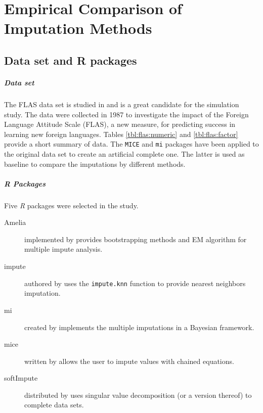 \chapter{Empirical Comparison of Imputation Methods}



\section{Data set and R packages}

\paragraph{Data set} The FLAS data set is studied in \cite{schafer1997analysis} and is a great
candidate for the simulation study. The data were collected in 1987 to
investigate the impact of the Foreign Language Attitude Scale (FLAS), a new
measure, for predicting success in learning new foreign languages. Tables
\ref{tbl:flas:numeric} and \ref{tbl:flas:factor} provide a short summary of
data. The \texttt{MICE} and \texttt{mi} packages have been applied to the original
data set to create an artificial complete one. The latter is used as baseline
to compare the imputations by different methods.

\paragraph{R Packages}

Five \emph{R} packages were selected in the study.

\begin{description}
\item[Amelia] implemented by \cite{honaker2011amelia} provides bootstrapping
  methods and EM algorithm for multiple impute analysis.
\item[impute] authored by \cite{hastie1999impute} uses the
  \texttt{impute.knn} function to provide nearest neighbors imputation.
\item[mi] created by \cite{gelman2011mi} implements the multiple imputations in
  a Bayesian framework.
\item[mice] written by \cite{vanburren2011mice} allows the user to impute
  values with chained equations.
\item[softImpute] distributed by \cite{hastie2015softimpute} uses singular value
  decomposition (or a version thereof) to complete data sets.
\end{description}

